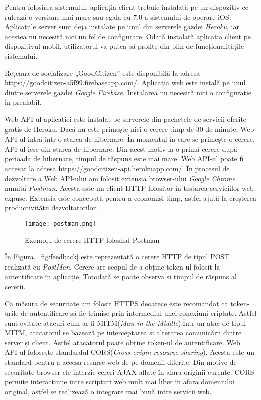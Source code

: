 Pentru folosirea sistemului, aplicația client trebuie instalată pe un dispozitiv ce rulează o versiune mai
mare sau egala cu 7.0 a sistemului de operare iOS. Aplicațiile server sunt deja instalate pe unul din 
serverele gazdei \textit{Heroku}, iar acestea nu necesită nici un fel de configurare. Odată instalată aplicația
client pe dispozitivul mobil, utilizatorul va putea să profite din plin de funcționalitățile sistemului. 

Rețeaua de socializare „GoodCitizen” este disponibilă la adresa \mbox{https://goodcitizen-a5f99.firebaseapp.com/}.
Aplicația web este instală pe unul dintre serverele gazdei \textit{Google Firebase}. Instalarea nu necesită 
nici o configurație în prealabil.

Web API-ul aplicației este instalat pe serverele din pachetele de servicii oferite gratis de Heroku.
Dacă nu este primește nici o cerere timp de 30 de minute, Web API-ul intră într-o starea de hibernare.
În momentul în care se primește o cerere, API-ul iese din starea de hibernare. Din acest motiv la o primă cerere după perioada de hibernare,
timpul de răspuns este mai mare. Web API-ul poate fi accesat la adresa \mbox{https://goodcitizen-api.herokuapp.com/}.
În procesul de dezvoltare a Web API-ului am folosit extensia browser-ului \textit{Google Chrome} numită \textit{Postman}.
Acesta este un client HTTP folositor în testarea serviciilor web expuse. Extensia este concepută
pentru a economisi timp, astfel ajută la creșterea productivității dezvoltatorilor.

\begin{figure}[h]
 \texttt{[image: postman.png]}
\centering
\caption{Exemplu de cerere HTTP folosind Postman}
\label{fig:postman}
\end{figure}

În Figura.~\ref{fig:feedback} este reprezentată o cerere HTTP de tipul POST realizată cu \textit{PostMan}. 
Cerere are scopul de a obține token-ul folosit la autentificare în aplicație.
Totodată se poate observa și timpul de răspuns al cererii.

    Ca măsura de securitate am folosit HTTPS deoarece este recomandat ca token-urile de 
autentificare să fie trimise prin intermediul unei conexiuni criptate. Astfel sunt evitate 
atacuri cum ar fi MITM(\textit{Man in the Middle}).Într-un atac de tipul MITM, atacatorul 
se bazează pe interceptarea și alterarea comunicării dintre server și client. Astfel 
atacatorul poate obține token-ul de autentificare.
    Web API-ul folosește standardul CORS(\textit{Cross-origin resource sharing}). Acesta este un standard pentru 
a accesa resurse web de pe domenii diferite. Din motive de securitate browser-ele interzic cereri AJAX aflate în 
afara originii curente. CORS permite interacțiune intre scripturi web mult mai liber în afara 
domeniului original, astfel se realizează o integrare mai bună intre servicii web.
   



 